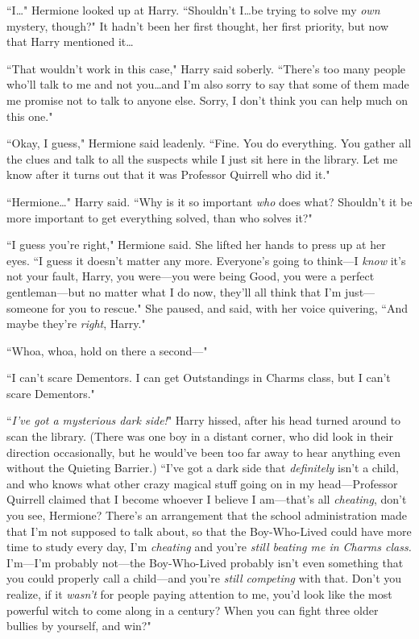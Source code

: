 ``I…" Hermione looked up at Harry. ``Shouldn't I…be trying to solve my \emph{own} mystery, though?" It hadn't been her first thought, her first priority, but now that Harry mentioned it…

``That wouldn't work in this case," Harry said soberly. ``There's too many people who'll talk to me and not you…and I'm also sorry to say that some of them made me promise not to talk to anyone else. Sorry, I don't think you can help much on this one."

``Okay, I guess," Hermione said leadenly. ``Fine. You do everything. You gather all the clues and talk to all the suspects while I just sit here in the library. Let me know after it turns out that it was Professor Quirrell who did it."

``Hermione…" Harry said. ``Why is it so important \emph{who} does what? Shouldn't it be more important to get everything solved, than who solves it?"

``I guess you're right," Hermione said. She lifted her hands to press up at her eyes. ``I guess it doesn't matter any more. Everyone's going to think—I \emph{know} it's not your fault, Harry, you were—you were being Good, you were a perfect gentleman—but no matter what I do now, they'll all think that I'm just—someone for you to rescue." She paused, and said, with her voice quivering, ``And maybe they're \emph{right}, Harry."

``Whoa, whoa, hold on there a second—"

``I can't scare Dementors. I can get Outstandings in Charms class, but I can't scare Dementors."

``\emph{I've got a mysterious dark side!}" Harry hissed, after his head turned around to scan the library. (There was one boy in a distant corner, who did look in their direction occasionally, but he would've been too far away to hear anything even without the Quieting Barrier.) ``I've got a dark side that \emph{definitely} isn't a child, and who knows what other crazy magical stuff going on in my head—Professor Quirrell claimed that I become whoever I believe I am—that's all \emph{cheating}, don't you see, Hermione? There's an arrangement that the school administration made that I'm not supposed to talk about, so that the Boy-Who-Lived could have more time to study every day, I'm \emph{cheating} and you're \emph{still beating me in Charms class.} I'm—I'm probably not—the Boy-Who-Lived probably isn't even something that you could properly call a child—and you're \emph{still competing} with that. Don't you realize, if it \emph{wasn't} for people paying attention to me, you'd look like the most powerful witch to come along in a century? When you can fight three older bullies by yourself, and win?"

